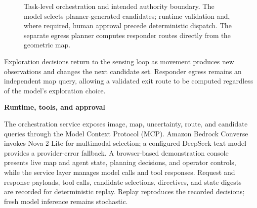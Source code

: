 \documentclass[10pt,a4paper]{article}
\newcommand{\indentedheading}[1]{\par\addvspace{0.65em}\noindent\hspace*{1em}\textbf{#1}\par\smallskip}
\begin{document}
\begin{figure}[t]
\centering
{}
\caption{Task-level orchestration and intended authority boundary.
The model selects planner-generated candidates; runtime validation
and, where required, human approval precede deterministic dispatch.
The separate egress planner computes responder routes directly
from the geometric map.}
\label{fig:llm-control}
\end{figure}

Exploration decisions return to the sensing loop as movement produces
new observations and changes the next candidate set. Responder egress
remains an independent map query, allowing a validated exit route to
be computed regardless of the model's exploration choice.

\indentedheading{Runtime, tools, and approval}

The orchestration service exposes image, map, uncertainty, route,
and candidate queries through the Model Context Protocol (MCP).
Amazon Bedrock Converse invokes Nova 2 Lite for multimodal selection;
a configured DeepSeek text model provides a provider-error fallback.
A browser-based demonstration console presents live map and agent
state, planning decisions, and operator controls, while the service
layer manages model calls and tool responses. Request and response
payloads, tool calls, candidate selections, directives, and state
digests are recorded for deterministic replay. Replay reproduces
the recorded decisions; fresh model inference remains stochastic.
\end{document}
